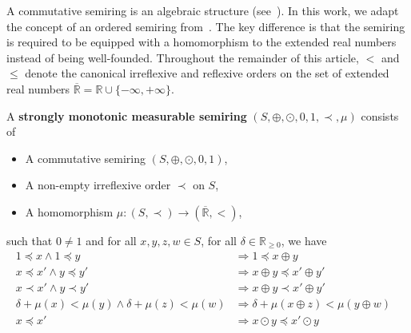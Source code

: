 A commutative semiring is an algebraic structure (see~\cite{bruggink2015proving}\cite{endrullis2024generalized_arxiv_v2}). In this work, we adapt the concept of an ordered semiring from~\cite{endrullis2024generalized_arxiv_v2}. 
The key difference is that the semiring is required to be equipped with a homomorphism to the extended real numbers instead of being well-founded.
Throughout the remainder of this article, $<$ and $\leq$ denote the canonical irreflexive and reflexive orders on the set of extended real numbers $\overline{\mathbb{R}} = \mathbb{R} \cup \{-\infty, +\infty\}$.
\begin{definition}
    \label{def:real_strongly_monotonic_semiring}
    A \textbf{strongly monotonic measurable semiring} $(S, \oplus, \odot, 0, 1, \prec, \mu)$ consists of
    \begin{itemize} 
        \item A commutative semiring $(S, \oplus, \odot, 0, 1)$,
        \item A non-empty irreflexive order $\prec$ on $S$,
        \item A homomorphism $\mu : (S, \prec) \to ( \overline{\mathbb{R}}, < )$,
    \end{itemize}
    such that $0 \neq 1$ and for all $x,y,z,w \in S$, for all $\delta \in \mathbb{R}_{\geq 0}$, we have
        \begin{align*}
            1 \preceq x \land 1 \preceq y 
            &\Rightarrow
            1 \preceq x \oplus y
            &\tag{S0} \label{ax:s0} 
            \\ 
            x \preceq x' \land y \preceq y' 
            &\Rightarrow
            x \oplus y \preceq x' \oplus y'
            &\tag{S1} \label{ax:s1} 
            \\   
            x \prec x' \land y \prec y'  
            &\Rightarrow
            x \oplus y \prec x' \oplus y'
            &\tag{S2} \label{ax:s2} 
            \\
            \delta + \mu(x) < \mu(y) \land \delta + \mu(z) < \mu(w)
            &\Rightarrow
            \delta + \mu(x \oplus z) < \mu(y \oplus w)
            &\tag{S3} \label{ax:s2'}
            \\
            x \preceq x'
            &\Rightarrow 
            x \odot y \preceq x' \odot y 

\end{align*}
\end{definition}
